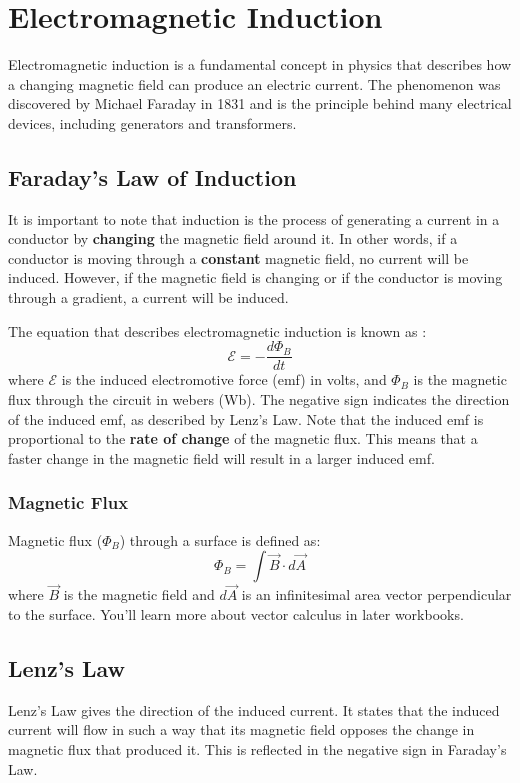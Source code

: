 \chapter{Electromagnetic Induction}

Electromagnetic induction is a fundamental concept in physics that describes how a changing magnetic field can produce an electric current. The phenomenon was discovered by Michael Faraday in 1831 and is the principle behind many electrical devices, including generators and transformers.

\section{Faraday's Law of Induction}
It is important to note that induction is the process of generating a current in a conductor by \textbf{changing} the magnetic field around it. In other words, if a conductor is moving through a \textbf{constant} magnetic field, no current will be induced. However, if the magnetic field is changing or if the conductor is moving through a gradient, a current will be induced.

The equation that describes electromagnetic induction is known as :
\[
\mathcal{E} = -\frac{d\Phi_B}{dt}
\]
where $\mathcal{E}$ is the induced electromotive force (emf) in volts, and $\Phi_B$ is the magnetic 
flux through the circuit in webers (Wb). The negative sign indicates the direction of the induced emf, as described by Lenz's Law.
Note that the induced emf is proportional to the \textbf{rate of change} of the magnetic flux. This means that a faster change in the magnetic 
field will result in a larger induced emf.

\subsection{Magnetic Flux}
Magnetic flux ($\Phi_B$) through a surface is defined as:
\[
\Phi_B = \int \vec{B} \cdot d\vec{A}
\]  
where $\vec{B}$ is the magnetic field and $d\vec{A}$ is an infinitesimal area vector perpendicular to the surface. You'll learn more about vector calculus in later workbooks.

\section{Lenz's Law}
Lenz's Law gives the direction of the induced current. It states that the induced current will flow in such a way that its magnetic field opposes the change in magnetic flux that produced it. This is reflected in the negative sign in Faraday's Law.

